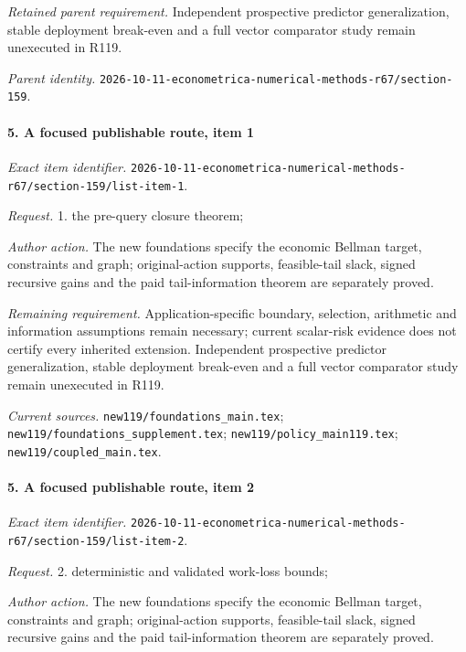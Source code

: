 \par\emph{Retained parent requirement.} Independent prospective predictor generalization, stable deployment break-even and a full vector comparator study remain unexecuted in R119.

\par\emph{Parent identity.} \nolinkurl{2026-10-11-econometrica-numerical-methods-r67/section-159}.

\paragraph{5. A focused publishable route, item 1}

\emph{Exact item identifier.} \nolinkurl{2026-10-11-econometrica-numerical-methods-r67/section-159/list-item-1}.

\par\emph{Request.} 1. the pre-query closure theorem;

\par\emph{Author action.} The new foundations specify the economic Bellman target, constraints and graph; original-action supports, feasible-tail slack, signed recursive gains and the paid tail-information theorem are separately proved.

\par\emph{Remaining requirement.} Application-specific boundary, selection, arithmetic and information assumptions remain necessary; current scalar-risk evidence does not certify every inherited extension. Independent prospective predictor generalization, stable deployment break-even and a full vector comparator study remain unexecuted in R119.

\par\emph{Current sources.} \nolinkurl{new119/foundations_main.tex}; \nolinkurl{new119/foundations_supplement.tex}; \nolinkurl{new119/policy_main119.tex}; \nolinkurl{new119/coupled_main.tex}.

\paragraph{5. A focused publishable route, item 2}

\emph{Exact item identifier.} \nolinkurl{2026-10-11-econometrica-numerical-methods-r67/section-159/list-item-2}.

\par\emph{Request.} 2. deterministic and validated work-loss bounds;

\par\emph{Author action.} The new foundations specify the economic Bellman target, constraints and graph; original-action supports, feasible-tail slack, signed recursive gains and the paid tail-information theorem are separately proved.

